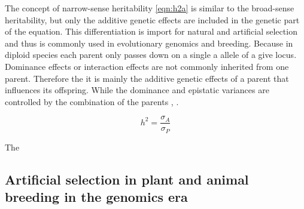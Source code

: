 The concept of narrow-sense heritability \ref{eqn:h2a} is similar to the broad-sense heritability, but only
the additive genetic effects are included in the genetic part of the equation. This differentiation is import
for natural and artificial selection and thus is commonly used in evolutionary genomics and breeding. Because
in diploid species each parent only passes down on a single a allele of a give locus. Dominance effects or
interaction effects are not commonly inherited from one parent. Therefore the it is mainly the additive
genetic effects of a parent that influences its offspring. While the dominance and epistatic variances are
controlled by the combination of the parents \cite{falconer1996}, \cite{walsh2018}.



\begin{equation}
 h^2 = \frac{\sigma_{A}}{\sigma_{P}}
 \label{eqn:h2a}
\end{equation}

The 


\subsection{Artificial selection in plant and animal breeding in the genomics era}

